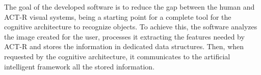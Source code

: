 	
	The goal of the developed software is to reduce the gap between the human and ACT-R visual systems, being a starting point for a complete  tool for the cognitive architecture to recognize objects. To achieve this, the software analyzes the image created for the user, processes it extracting the features needed by ACT-R and stores the information in dedicated data structures. Then, when requested by the cognitive architecture, it communicates to the artificial intelligent framework all the stored information. 
	

